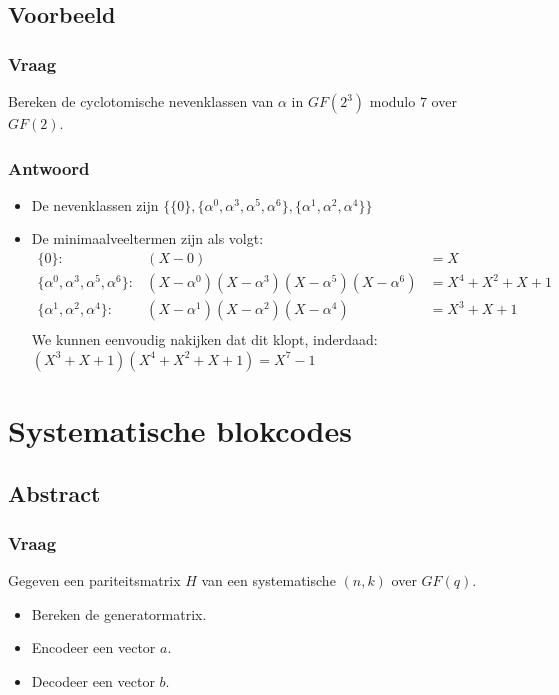 \documentclass[main.tex]{subfiles}
\begin{document}
\subsection*{Voorbeeld}
\subsubsection*{Vraag}
Bereken de cyclotomische nevenklassen van $\alpha$ in $GF(2^{3})$ modulo $7$ over $GF(2)$.
\subsubsection*{Antwoord}
\begin{itemize}
\item De nevenklassen zijn $\{ \{0\}, \{\alpha^{0}, \alpha^{3}, \alpha^{5}, \alpha^{6}\}, \{\alpha^{1}, \alpha^{2}, \alpha^{4} \} \}$
\item De minimaalveeltermen zijn als volgt:
  \[
  \begin{array}{rll}
    \{0\} :& (X-0) &= X\\
    \{\alpha^{0}, \alpha^{3}, \alpha^{5}, \alpha^{6}\} :& (X-\alpha^{0})(X-\alpha^{3})(X-\alpha^{5})(X-\alpha^{6}) &= X^4+X^2+X+1\\
    \{\alpha^{1}, \alpha^{2}, \alpha^{4} \} :& (X-\alpha^{1})(X-\alpha^{2})(X-\alpha^{4}) &= X^{3}+X+1\\
  \end{array}
  \]
  We kunnen eenvoudig nakijken dat dit klopt, inderdaad: $(X^{3}+X+1)(X^4+X^2+X+1) = X^{7}-1$
\end{itemize}


\newpage
\section{Systematische blokcodes}
\subsection*{Abstract}
\subsubsection*{Vraag}
Gegeven een pariteitsmatrix $H$ van een systematische $(n,k)$ over $GF(q)$.
\begin{itemize}
\item Bereken de generatormatrix.
\item Encodeer een vector $a$.
\item Decodeer een vector $b$.
\end{itemize}
\end{document}

